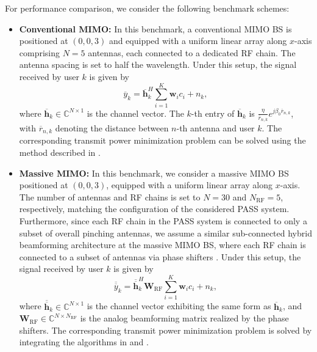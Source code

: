 For performance comparison, we consider the following benchmark schemes:
\begin{itemize}
  \item \textbf{Conventional MIMO:} In this benchmark, a conventional MIMO BS is positioned at $(0,0,3)$ and equipped with a uniform linear array along $x$-axis  comprising $N = 5$ antennas, each connected to a dedicated RF chain. The antenna spacing is set to half the wavelength. Under this setup, the signal received by user $k$ is given by 
  \begin{equation}
    \overline{y}_k = \overline{\mathbf{h}}_k^H \sum_{i=1}^K \mathbf{w}_i c_i + n_k,
  \end{equation}
  where $\overline{\mathbf{h}}_k \in \mathbb{C}^{N \times 1}$ is the channel vector. The $k$-th entry of $\overline{\mathbf{h}}_k$ is $\frac{\eta}{\overline{r}_{n,k}}e^{j \beta_0 \overline{r}_{n,k}}$, with $\overline{r}_{n,k}$ denoting the distance between $n$-th antenna and user $k$. The corresponding transmit power minimization problem can be solved using the method described in \cite{bjornson2014optimal}.
  
  \item \textbf{Massive MIMO:} In this benchmark, we consider a massive MIMO BS positioned at $(0,0,3)$, equipped with a uniform linear array along $x$-axis. The number of antennas and RF chains is set to $N = 30$ and $N_{\mathrm{RF}} = 5$, respectively, matching the configuration of the considered PASS system. Furthermore, since each RF chain in the PASS system is connected to only a subset of overall pinching antennas, we assume a similar sub-connected hybrid beamforming architecture at the massive MIMO BS, where each RF chain is connected to a subset of antennas via phase shifters \cite{yu2016alternating}. Under this setup, the signal received by user $k$ is given by 
  \begin{equation}
    \overline{\overline{y}}_k = \overline{\overline{\mathbf{h}}}_k^H \mathbf{W}_{\mathrm{RF}} \sum_{i=1}^K \mathbf{w}_i c_i + n_k,
  \end{equation}
  where $\overline{\overline{\mathbf{h}}}_k \in \mathbb{C}^{N \times 1}$ is the channel vector exhibiting the same form as $\overline{\mathbf{h}}_k$, and $\mathbf{W}_{\mathrm{RF}} \in \mathbb{C}^{N \times N_{\mathrm{RF}}}$ is the analog beamforming matrix realized by the phase shifters. The corresponding transmit power minimization problem is solved by integrating the algorithms in \cite{yu2016alternating} and \cite{shi2018spectral}.  
\end{itemize}

